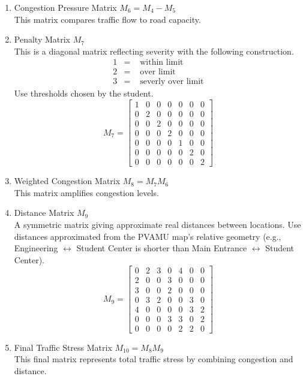 \documentclass{ximera}
\begin{document}
\begin{enumerate}
    \item Congestion Pressure Matrix $M_6=M_4-M_5$\\
    This matrix compares traffic flow to road capacity.\\

    \item Penalty Matrix $M_7$\\
    This is a diagonal matrix reflecting severity with the following construction.
    \begin{eqnarray*}
        1 & = & \mbox{ within limit} \\
        2 & = & \mbox{ over limit} \\
        3 & = & \mbox{ severly over limit} 
    \end{eqnarray*}
    Use thresholds chosen by the student.\\

    \[
M_7=
\begin{bmatrix}
1 & 0 & 0 & 0 & 0 & 0 & 0 \\
0 & 2 & 0 & 0 & 0 & 0 & 0 \\
0 & 0 & 2 & 0 & 0 & 0 & 0 \\
0 & 0 & 0 & 2 & 0 & 0 & 0 \\
0 & 0 & 0 & 0 & 1 & 0 & 0 \\
0 & 0 & 0 & 0 & 0 & 2 & 0 \\
0 & 0 & 0 & 0 & 0 & 0 & 2
\end{bmatrix}
\]

    \item Weighted Congestion Matrix $M_8=M_7 M_6$\\
    This matrix amplifies congestion levels.

    \item Distance Matrix $M_9$\\
    A symmetric matrix giving approximate real distances between locations. Use distances approximated from the PVAMU map's relative geometry (e.g., Engineering $\leftrightarrow$ Student Center is shorter than Main Entrance $\leftrightarrow$ Student Center).\\

    \[
M_9=
\begin{bmatrix}
0 & 2 & 3 & 0 & 4 & 0 & 0 \\
2 & 0 & 0 & 3 & 0 & 0 & 0 \\
3 & 0 & 0 & 2 & 0 & 0 & 0 \\
0 & 3 & 2 & 0 & 0 & 3 & 0 \\
4 & 0 & 0 & 0 & 0 & 3 & 2 \\
0 & 0 & 0 & 3 & 3 & 0 & 2 \\
0 & 0 & 0 & 0 & 2 & 2 & 0
\end{bmatrix}
\]

    \item Final Traffic Stress Matrix $M_{10}=M_8M_9$\\
    This final matrix represents total traffic stress by combining congestion and distance.
\end{enumerate}
\end{document}
